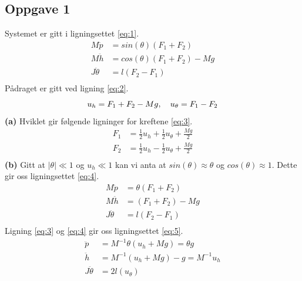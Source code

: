 \documentclass[11pt, a4paper, norsk]{rapport1} %
\begin{document}
\subsection{Oppgave 1}
Systemet er gitt i ligningsettet \ref{eq:1}.
\begin{equation}
    \label{eq:1}
    \begin{aligned}
        M\ddot{p} &= sin(\theta)(F_1 + F_2) \\
        M\ddot{h} &= cos(\theta)(F_1 + F_2) - Mg \\
        J\ddot{\theta} &= l(F_2 - F_1) \\
    \end{aligned}
\end{equation}
Pådraget er gitt ved ligning \ref{eq:2}.
\begin{equation}
    \label{eq:2}
    u_h = F_1 + F_2 - Mg, \quad u_\theta = F_1 - F_2 \\
\end{equation}
\textbf{(a)}
Hviklet gir følgende ligninger for kreftene \ref{eq:3}.
\begin{equation}
    \begin{aligned}
        \label{eq:3}
        F_1 &= \frac{1}{2}u_h + \frac{1}{2}u_\theta + \frac{Mg}{2} \\
        F_2 &= \frac{1}{2}u_h - \frac{1}{2}u_\theta + \frac{Mg}{2} \\
    \end{aligned}
\end{equation}
\textbf{(b)} Gitt at $|\theta| \ll 1$ og $ u_h\ll 1$ kan vi anta at $sin(\theta) \approx \theta$ og $cos(\theta) \approx 1$. Dette gir oss ligningsettet \ref{eq:4}.
\begin{equation}
    \label{eq:4}
    \begin{aligned}
        M\ddot{p} &= \theta(F_1 + F_2) \\
        M\ddot{h} &= (F_1 + F_2) - Mg \\
        J\ddot{\theta} &= l(F_2 - F_1) \\
    \end{aligned}
\end{equation}
Ligning \ref{eq:3} og \ref{eq:4} gir oss ligningsettet \ref{eq:5}.
\begin{equation}
    \begin{aligned}
        \label{eq:5}
        \ddot{p} &= M^{-1}\theta(u_h + Mg)  = \theta g\\
        \ddot{h} &= M^{-1}(u_h + Mg) - g  = M^{-1}u_h\\
        J\ddot{\theta} &= 2l(u_\theta) \\
    \end{aligned}
\end{equation}
\end{document}
